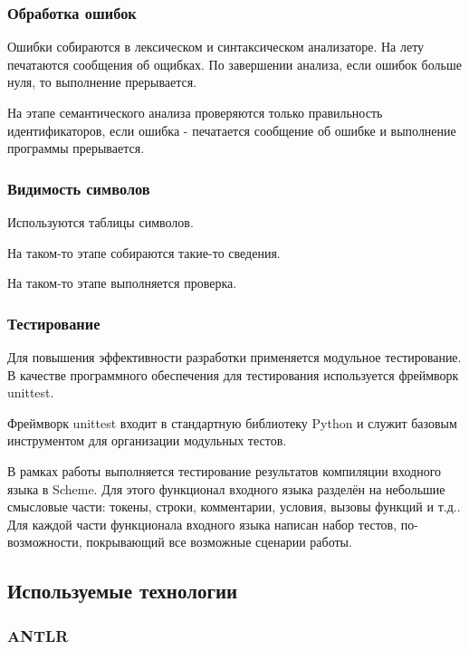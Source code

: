 \documentclass[12pt,a4paper,oneside]{extarticle}
\begin{document}
        \subsubsection{Обработка ошибок}
            Ошибки собираются в лексическом и синтаксическом анализаторе. На лету печатаются сообщения об ощибках. По завершении анализа, если ошибок больше нуля, то выполнение прерывается.

            На этапе семантического анализа проверяются только правильность идентификаторов, если ошибка - печатается сообщение об ошибке и выполнение программы прерывается.

        \subsubsection{Видимость символов}
            Используются таблицы символов.

            На таком-то этапе собираются такие-то сведения.

            На таком-то этапе выполняется проверка.

        \subsubsection{Тестирование}
            Для повышения эффективности разработки применяется модульное тестирование.
            В качестве программного обеспечения для тестирования используется фреймворк unittest.

            Фреймворк unittest входит в стандартную библиотеку Python и служит базовым инструментом для организации модульных тестов.

            В рамках работы выполняется тестирование результатов компиляции входного языка в Scheme.
            Для этого функционал входного языка разделён на небольшие смысловые части: токены, строки, комментарии, условия, вызовы функций и т.д..
            Для каждой части функционала входного языка написан набор тестов, по-возможности, покрывающий все возможные сценарии работы.
    \clearpage

    \subsection{Используемые технологии}
        \subsubsection{ANTLR}
            \label{subsec:antlr}
\end{document}
